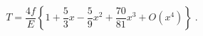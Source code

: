 \begin{equation}
\label{3-18}
T = \frac{4 f}{E}\left\{1+ \frac53 x - \frac59 x^2 +
\frac{70}{81} x^3 + O(x^4)\right\}\;.
\end{equation}

